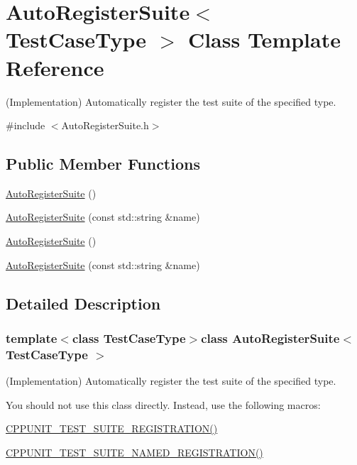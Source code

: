 \hypertarget{class_auto_register_suite}{\section{Auto\+Register\+Suite$<$ Test\+Case\+Type $>$ Class Template Reference}
\label{class_auto_register_suite}
}


(Implementation) Automatically register the test suite of the specified type.  




{\ttfamily \#include $<$Auto\+Register\+Suite.\+h$>$}

\subsection*{Public Member Functions}
\begin{DoxyCompactItemize}
\item 
\hyperlink{class_auto_register_suite_a4c02d0d6e3de726f67b875dc5615e22a}{Auto\+Register\+Suite} ()
\item 
\hyperlink{class_auto_register_suite_a9350fa1995545aad03b61b7a6db690e4}{Auto\+Register\+Suite} (const std\+::string \&name)
\item 
\hyperlink{class_auto_register_suite_a4c02d0d6e3de726f67b875dc5615e22a}{Auto\+Register\+Suite} ()
\item 
\hyperlink{class_auto_register_suite_a9350fa1995545aad03b61b7a6db690e4}{Auto\+Register\+Suite} (const std\+::string \&name)
\end{DoxyCompactItemize}


\subsection{Detailed Description}
\subsubsection*{template$<$class Test\+Case\+Type$>$class Auto\+Register\+Suite$<$ Test\+Case\+Type $>$}

(Implementation) Automatically register the test suite of the specified type. 

You should not use this class directly. Instead, use the following macros\+:
\begin{DoxyItemize}
\item \hyperlink{group___creating_test_suite_ga2f4071eec88d1e306665ada0f2dd80e4}{C\+P\+P\+U\+N\+I\+T\+\_\+\+T\+E\+S\+T\+\_\+\+S\+U\+I\+T\+E\+\_\+\+R\+E\+G\+I\+S\+T\+R\+A\+T\+I\+O\+N()}
\item \hyperlink{group___creating_test_suite_ga028a5855a40ad3836e2a26aa48cd4c91}{C\+P\+P\+U\+N\+I\+T\+\_\+\+T\+E\+S\+T\+\_\+\+S\+U\+I\+T\+E\+\_\+\+N\+A\+M\+E\+D\+\_\+\+R\+E\+G\+I\+S\+T\+R\+A\+T\+I\+O\+N()}
\end{DoxyItemize}

